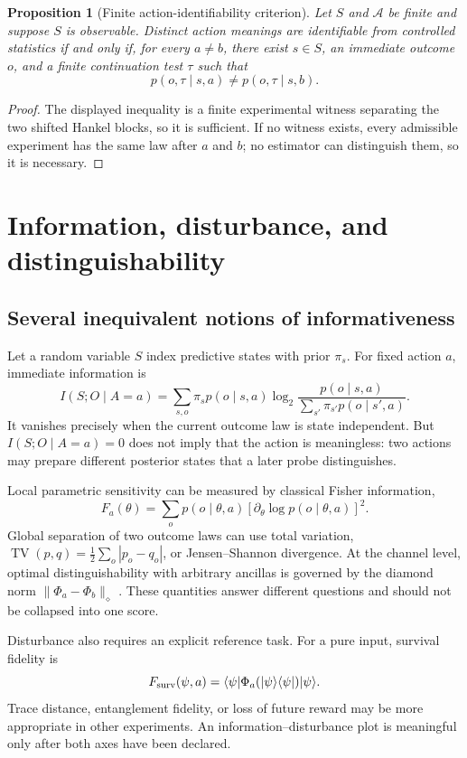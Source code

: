 \documentclass[11pt]{article}
\newtheorem{proposition}[theorem]{Proposition}
\theoremstyle{definition}
\theoremstyle{remark}
\newcommand{\cA}{\mathcal A}
\newcommand{\TV}{\operatorname{TV}}
\begin{document}
\begin{proposition}[Finite action-identifiability criterion]
Let \(S\) and \(\cA\) be finite and suppose \(S\) is observable. Distinct
action meanings are identifiable from controlled statistics if and only if,
for every \(a\ne b\), there exist \(s\in S\), an immediate outcome \(o\), and
a finite continuation test \(\tau\) such that
\[
p(o,\tau\mid s,a)\ne p(o,\tau\mid s,b).
\]
\end{proposition}
\begin{proof}
The displayed inequality is a finite experimental witness separating the two
shifted Hankel blocks, so it is sufficient. If no witness exists, every
admissible experiment has the same law after \(a\) and \(b\); no estimator can
distinguish them, so it is necessary.
\end{proof}

\section{Information, disturbance, and distinguishability}

\subsection{Several inequivalent notions of informativeness}

Let a random variable \(S\) index predictive states with prior \(\pi_s\). For
fixed action \(a\), immediate information is
\[
I(S;O\mid A=a)=
\sum_{s,o}\pi_s p(o\mid s,a)
\log_2\frac{p(o\mid s,a)}{\sum_{s'}\pi_{s'}p(o\mid s',a)}.
\]
It vanishes precisely when the current outcome law is state independent. But
\(I(S;O\mid A=a)=0\) does not imply that the action is meaningless: two
actions may prepare different posterior states that a later probe
distinguishes.

Local parametric sensitivity can be measured by classical Fisher information,
\[
F_a(\theta)=\sum_o p(o\mid\theta,a)
[\partial_\theta\log p(o\mid\theta,a)]^2.
\]
Global separation of two outcome laws can use total variation,
\(\TV(p,q)=\frac12\sum_o|p_o-q_o|\), or Jensen--Shannon divergence. At the
channel level, optimal distinguishability with arbitrary ancillas is governed
by the diamond norm \(\|\Phi_a-\Phi_b\|_\diamond\) \cite{Watrous2018}. These
quantities answer different questions and should not be collapsed into one
score.

Disturbance also requires an explicit reference task. For a pure input,
survival fidelity is
\[
F_{\rm surv}(\psi,a)=
\langle\psi|\Phi_a(|\psi\rangle\langle\psi|)|\psi\rangle.
\]
Trace distance, entanglement fidelity, or loss of future reward may be more
appropriate in other experiments. An information--disturbance plot is
meaningful only after both axes have been declared.
\end{document}
